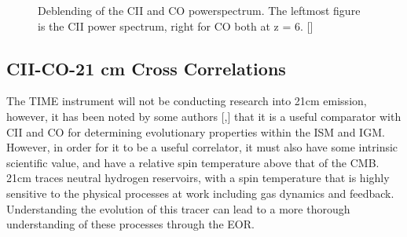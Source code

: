 \documentclass[manuscript]{aastex}
\begin{document}
\begin{figure}[h!]
    \centering
    \qquad
    \singlespace
    \caption[Deblending of the CII and CO power spectrums. -(\cite{Cheng2016})]{Deblending of the CII and CO powerspectrum. The leftmost figure is the CII power spectrum, right for CO both at z = 6. [\cite{Cheng2016}]}%
    \label{fig:cheng1}%
\end{figure}

\subsection{CII-CO-21 cm Cross Correlations}
The TIME instrument will not be conducting research into 21cm emission, however, it has been noted by some authors [\cite{Zaroubi2012},\cite{Gong2012}] that it is a useful comparator with CII and CO for determining evolutionary properties within the ISM and IGM. However, in order for it to be a useful correlator, it must also have some intrinsic scientific value, and have a relative spin temperature above that of the CMB. 21cm traces neutral hydrogen reservoirs, with a spin temperature that is highly sensitive to the physical processes at work including gas dynamics and feedback. Understanding the evolution of this tracer can lead to a more thorough understanding of these processes through the EOR. 
\end{document}
